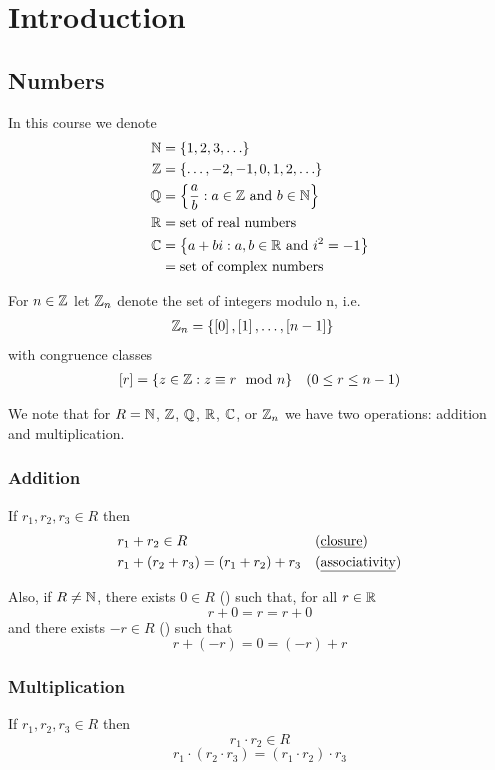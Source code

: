 \chapter{Introduction}

\section{Numbers}
In this course we denote
\begin{align*}
  \mathbb{N} &= \left\{1,2,3,\ldots\right\} \\
  \mathbb{Z} &= \left\{\ldots, -2, -1, 0, 1, 2, \ldots\right\} \\
  \mathbb{Q} &= \left\{\frac{a}{b} : a \in \mathbb{Z} \text{ and } b \in \mathbb{N}\right\} \\
  \mathbb{R} &= \text{set of real numbers} \\
  \mathbb{C} &= \left\{a+bi:a,b\in\mathbb{R} \text{ and } i^2 = -1\right\} \\
     &= \text{set of complex numbers}
\end{align*}

For $n \in \mathbb{Z}$ let $\mathbb{Z}_n$ denote the set of integers modulo n, i.e.
\begin{align*}
  \mathbb{Z}_n &= \left\{\left[0\right], \left[1\right], \ldots, \left[n-1\right]\right\}
\end{align*}
with congruence classes
\begin{align*}
  \left[r\right] &= \left\{z \in \mathbb{Z} : z \equiv r \mod n\right\} & (0 \le r \le n-1)
\end{align*}

We note that for $R = \mathbb{N}$, $\mathbb{Z}$, $\mathbb{Q}$, $\mathbb{R}$, $\mathbb{C}$, or $\mathbb{Z}_n$ we have two
operations: addition and multiplication.

\subsection{Addition}
If $r_1, r_2, r_3 \in R$ then
\begin{align*}
  & r_1 + r_2 \in R & &\text{(\keyword{closure})} \\
  & r_1 + (r_2 + r_3) = (r_1 + r_2) + r_3 & &\text{(\keyword{associativity})}
\end{align*}

Also, if $R \ne \mathbb{N}$, there exists $0 \in R$ () such that, for all
$r \in \mathbb{R}$
$$r + 0 = r = r + 0$$
and there exists $-r \in R$ () such that
$$r + (-r) = 0 = (-r) + r$$

\subsection{Multiplication}
If $r_1, r_2, r_3 \in R$ then
$$r_1 \cdot r_2 \in R$$
$$r_1 \cdot (r_2 \cdot r_3) = (r_1 \cdot r_2) \cdot r_3$$

